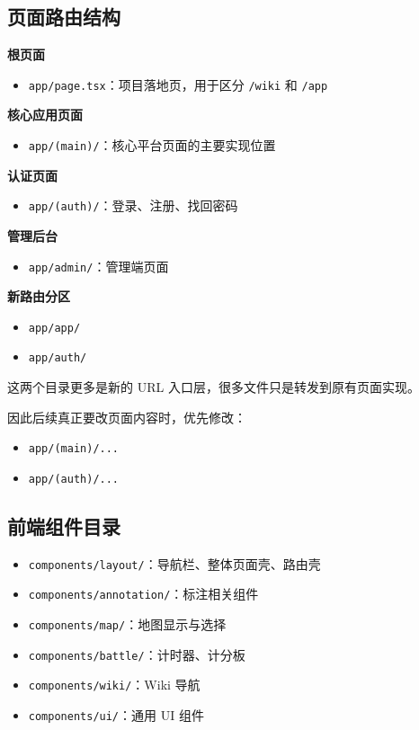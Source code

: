 \documentclass[11pt,a4paper]{ctexart}
\begin{document}
\subsection{页面路由结构}

\textbf{根页面}

\begin{itemize}
  \item \texttt{app/page.tsx}：项目落地页，用于区分 \texttt{/wiki} 和 \texttt{/app}
\end{itemize}

\textbf{核心应用页面}

\begin{itemize}
  \item \texttt{app/(main)/}：核心平台页面的主要实现位置
\end{itemize}

\textbf{认证页面}

\begin{itemize}
  \item \texttt{app/(auth)/}：登录、注册、找回密码
\end{itemize}

\textbf{管理后台}

\begin{itemize}
  \item \texttt{app/admin/}：管理端页面
\end{itemize}

\textbf{新路由分区}

\begin{itemize}
  \item \texttt{app/app/}
  \item \texttt{app/auth/}
\end{itemize}

这两个目录更多是新的 URL 入口层，很多文件只是转发到原有页面实现。

因此后续真正要改页面内容时，优先修改：

\begin{itemize}
  \item \texttt{app/(main)/...}
  \item \texttt{app/(auth)/...}
\end{itemize}

\subsection{前端组件目录}

\begin{itemize}
  \item \texttt{components/layout/}：导航栏、整体页面壳、路由壳
  \item \texttt{components/annotation/}：标注相关组件
  \item \texttt{components/map/}：地图显示与选择
  \item \texttt{components/battle/}：计时器、计分板
  \item \texttt{components/wiki/}：Wiki 导航
  \item \texttt{components/ui/}：通用 UI 组件
\end{itemize}
\end{document}

